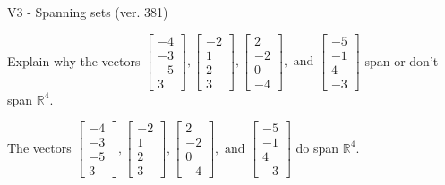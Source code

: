 \begin{exercise}
  \begin{exerciseTitle}V3 - Spanning sets (ver. 381)\end{exerciseTitle}
  \begin{exerciseStatement}
    Explain why the vectors \(\left[\begin{array}{r}
-4 \\
-3 \\
-5 \\
3
\end{array}\right] , \left[\begin{array}{r}
-2 \\
1 \\
2 \\
3
\end{array}\right] , \left[\begin{array}{r}
2 \\
-2 \\
0 \\
-4
\end{array}\right] , \text{ and } \left[\begin{array}{r}
-5 \\
-1 \\
4 \\
-3
\end{array}\right]\) span or don't span \(\mathbb{R}^4\). 
	


  \end{exerciseStatement}
  \begin{exerciseAnswer}
   The vectors \(\left[\begin{array}{r}
-4 \\
-3 \\
-5 \\
3
\end{array}\right] , \left[\begin{array}{r}
-2 \\
1 \\
2 \\
3
\end{array}\right] , \left[\begin{array}{r}
2 \\
-2 \\
0 \\
-4
\end{array}\right] , \text{ and } \left[\begin{array}{r}
-5 \\
-1 \\
4 \\
-3
\end{array}\right]\) 
  	 do  
	span \(\mathbb{R}^4\).
  


  \end{exerciseAnswer}
\end{exercise}